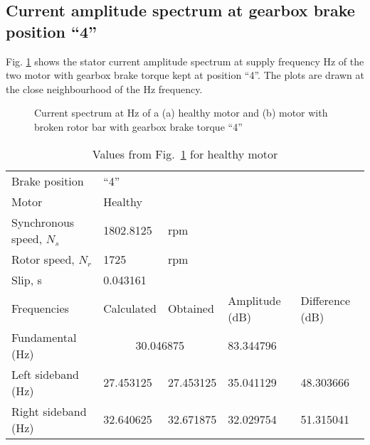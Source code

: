 \documentclass[a4paper,11pt]{report}
\begin{document}
\clearpage
\subsection{Current amplitude spectrum at gearbox brake position ``4''}
Fig. \ref{hb430ss} shows the stator current amplitude spectrum at supply frequency \unit[30]{Hz} of the two motor with gearbox brake torque kept at position ``4''. The plots are drawn at the close neighbourhood of the \unit[30]{Hz} frequency.

\begin{figure}[htbp]
\centering
\subfigure[]{\texttt{[image: h430]}}
\subfigure[]{\texttt{[image: b430]}}
\caption{Current spectrum at \unit[30]{Hz} of a (a) healthy motor and (b) motor with broken rotor bar  with gearbox brake torque ``4''} \label{hb430ss}
\end{figure}

\begin{table}[h]
\centering
\begin{tabular}{lllll}
Brake position	& ``4'' & & & \\			
Motor &	\multicolumn{4}{l}{Healthy} \\ 
Synchronous speed, $N_{s}$	& 1802.8125& rpm & & \\			
Rotor speed, $N_{r}$ 	  	& 1725	& rpm& & \\		
Slip, s			  	&  \multicolumn{4}{l}{0.043161} \\			
Frequencies 		  	& Calculated & Obtained & Amplitude (dB) & Difference (dB) \\
Fundamental (Hz)		& \multicolumn{2}{c}{30.046875}	& 83.344796 &  \\ 
Left sideband (Hz) 		& 27.453125 & 27.453125 & 35.041129 & 48.303666 \\
Right sideband (Hz)		& 32.640625 & 32.671875 & 32.029754 & 51.315041 
\end{tabular}
\caption{Values from Fig.~\ref{hb430ss} for healthy motor} \label{h430sst}
\end{table}
\end{document}
